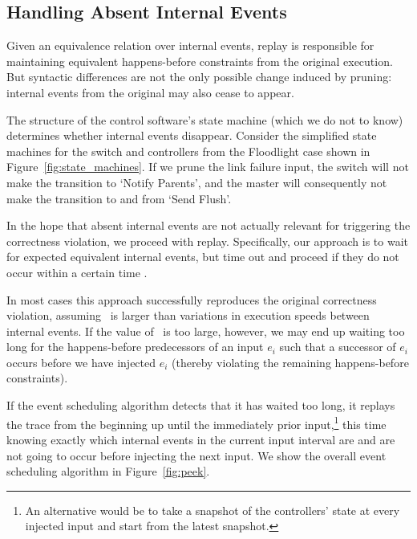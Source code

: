 \subsection{Handling Absent Internal Events}
\label{subsec:divergence}

Given an equivalence relation over internal events, replay
is responsible for maintaining equivalent happens-before constraints from the
original execution.
But syntactic differences are not the
only possible change induced by pruning: internal events from the original
may also cease to appear.

The structure of the control
software's state machine (which we do not to know) determines whether
internal events disappear. Consider the simplified state machines for the switch and
controllers from the Floodlight case shown in
Figure~\ref{fig:state_machines}. If we prune the link failure input, the
switch will not make the transition to `Notify Parents', and the master will
consequently not make the transition to and from `Send Flush'.

In the hope that absent internal events are not actually relevant
for triggering the correctness violation, we proceed with replay.
Specifically, our approach is to wait for expected equivalent internal events, but time out and proceed
if they do not occur within a certain time \textepsilon.

In most cases this approach successfully reproduces the original correctness
violation, assuming \textepsilon~is larger than variations in execution speeds
between internal events. If the value of \textepsilon~is too large, however, we may end up
waiting too long for the happens-before predecessors of an input $e_i$ such that a
successor of $e_i$ occurs before we have injected $e_i$
(thereby violating the remaining happens-before constraints).

If the event scheduling algorithm detects that it has waited too long, it
replays the trace from the beginning up until the immediately prior input,\footnote{An alternative
would be to take a snapshot of the controllers' state at every injected input
and start from the latest snapshot.} this time
knowing exactly which internal events in the current input interval are
and are not going to occur before injecting the next input. We show the overall event scheduling algorithm
in Figure~\ref{fig:peek}.

